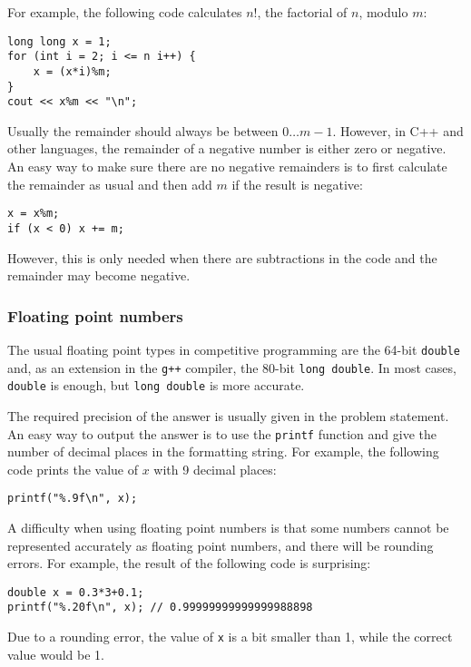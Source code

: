 For example, the following code calculates $n!$,
the factorial of $n$, modulo $m$:
\begin{lstlisting}
long long x = 1;
for (int i = 2; i <= n i++) {
    x = (x*i)%m;
}
cout << x%m << "\n";
\end{lstlisting}

Usually the remainder should always
be between $0\ldots m-1$.
However, in C++ and other languages,
the remainder of a negative number
is either zero or negative.
An easy way to make sure there
are no negative remainders is to first calculate
the remainder as usual and then add $m$
if the result is negative:
\begin{lstlisting}
x = x%m;
if (x < 0) x += m;
\end{lstlisting}
However, this is only needed when there
are subtractions in the code and the
remainder may become negative.

\subsubsection{Floating point numbers}


The usual floating point types in
competitive programming are
the 64-bit \texttt{double}
and, as an extension in the \texttt{g++} compiler,
the 80-bit \texttt{long double}.
In most cases, \texttt{double} is enough,
but \texttt{long double} is more accurate.

The required precision of the answer
is usually given in the problem statement.
An easy way to output the answer is to use
the \texttt{printf} function
and give the number of decimal places
in the formatting string.
For example, the following code prints
the value of $x$ with 9 decimal places:

\begin{lstlisting}
printf("%.9f\n", x);
\end{lstlisting}

A difficulty when using floating point numbers
is that some numbers cannot be represented
accurately as floating point numbers,
and there will be rounding errors.
For example, the result of the following code
is surprising:

\begin{lstlisting}
double x = 0.3*3+0.1;
printf("%.20f\n", x); // 0.99999999999999988898
\end{lstlisting}

Due to a rounding error,
the value of \texttt{x} is a bit smaller than 1,
while the correct value would be 1.

